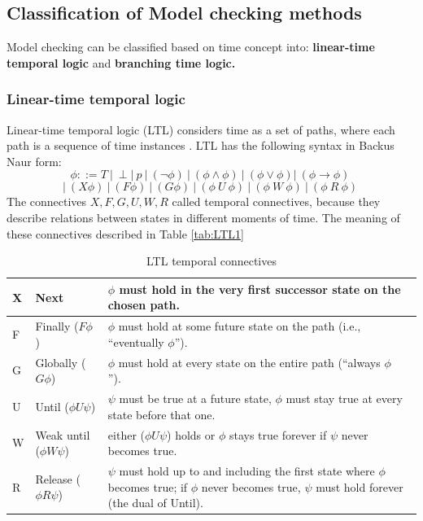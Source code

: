 \subsection {Classification of Model checking methods}
Model checking can be classified based on time concept into:
\textbf{linear-time temporal logic } and \textbf{branching time logic.}
\cite{HuthR1}
\\


\subsubsection{Linear-time temporal logic }
Linear-time temporal logic (LTL) considers time as a set of paths, where each path 
is a sequence of time instances \cite{HuthR1}.
LTL has the following syntax in Backus Naur form:
\[ \phi ::= T\ |\  \perp |\  p\ |\  (\neg\phi)\  |\  (\phi \land \phi)\  |\  (\phi \lor \phi) |\ (\phi \rightarrow \phi)\   \]
\[|\   (X \phi)\  |\  (F \phi)\  |\  (G \phi)\  |\  (\phi\ U\ \phi)\  |\  (\phi\ W\ \phi)\  |\  (\phi\ R\ \phi)\ \]
The connectives $X, F, G, U, W, R$ called temporal connectives, because they describe relations between states in different moments of time.
The meaning of these connectives described in Table \ref{tab:LTL1}\\

\begin{table}[h!]   
    \begin{center}
    \begin{tabular}{| m{0.6cm} | m{3.5cm} | m{9.5cm} |}
        \hline
        X & Next & $\phi$ must hold in the very first successor state on the chosen path.\\
        \hline
        F & Finally ($F \phi$) & $\phi$ must hold at some future state on the path  (i.e., “eventually $\phi$”).\\
        \hline
        G & Globally ($G \phi$) & $\phi$ must hold at every state on the entire path  (“always $\phi$”).\ \ \ \ \ \ \ \ \ \ \\
        \hline
        U & Until ($\phi U \psi$) & $\psi$ must be true at a future state, $\phi$ must stay true at every state before that one.\\
        \hline
        W & Weak until ($\phi W \psi$) & either ($\phi U \psi$) holds or $\phi$ stays true forever if $\psi$ never becomes true.\\
        \hline
        R & Release ($\phi R \psi$) & $\psi$ must hold up to and including the first state where 
        $\phi$ becomes true; if $\phi$ never becomes true, $\psi$ must hold forever (the dual of Until).\\
        \hline
    \end{tabular}
    \caption{LTL temporal connectives}
\end{center}
\end{table}
    \label{tab:LTL1}

